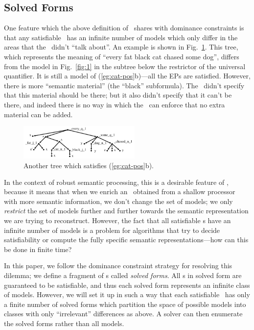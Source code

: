 \subsection{Solved Forms}

One feature which the above definition of \rmrs\ shares with dominance
constraints is that any satisfiable \rmrs\ has an infinite number of
models which only differ in the areas that the \rmrs\ didn't ``talk
about''.  An example is shown in Fig.~\ref{fig:fat-black-cat}.  This
tree, which represents the meaning of ``every fat black cat chased some
dog'', differs from the model in Fig.~\ref{fig:1} in the subtree below
the restrictor of the universal quantifier.  It is still a model of
(\ref{eg:cat-pos}b)---all the EPs are satisfied.  However, there is
more ``semantic material'' (the ``black'' subformula).
The \rmrs\ didn't specify that this material should be
there; but it also didn't specify that it can't be there, and indeed
there is no way in which the \rmrs\ can enforce that no extra material
can be added.


\begin{figure}
  \centering
  \includegraphics[width=6cm]{pic-more-stuff}
  \caption{Another tree which satisfies (\ref{eg:cat-pos}b).}
  \label{fig:fat-black-cat}
\end{figure}


In the context of robust semantic processing, this is a desirable
feature of \rmrs, because it means that when we enrich an \rmrs\
obtained from a shallow processor with more semantic information, we
don't change the set of models; we only \emph{restrict} the set of
models further and further towards the semantic representation we are
trying to reconstruct.  However, the fact that all satisfiable \rmrs s
have an infinite number of models is a problem for algorithms that try
to decide satisfiability or compute the fully specific semantic
representations---how can this be done in finite time?

In this paper, we follow the dominance constraint strategy for
resolving this dilemma; we
define a fragment of \rmrs s called \emph{solved forms}.  All \rmrs
s in solved form are guaranteed to be satisfiable, and thus each
solved form represents an infinite class of models.  However, we will
set it up in such a way that each satisfiable \rmrs\ has only a finite
number of solved forms which partition the space of possible models
into classes with only ``irrelevant'' differences as above.  A solver
can then enumerate the solved forms rather than all models.

